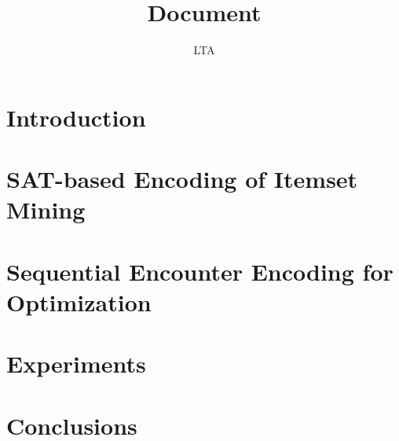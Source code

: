 \documentclass[13pt,a4paper]{report}
\title{Document}
\author{LTA}
\begin{document}










\fontsize{13}{15}\selectfont

\chapter{Introduction}





\chapter{SAT-based Encoding of Itemset Mining}




\chapter{Sequential Encounter Encoding for Optimization}




\chapter{Experiments}



\chapter{Conclusions}



\nocite{*}
\renewcommand{\bibname}{References}
\printbibliography
{}
\end{document}
